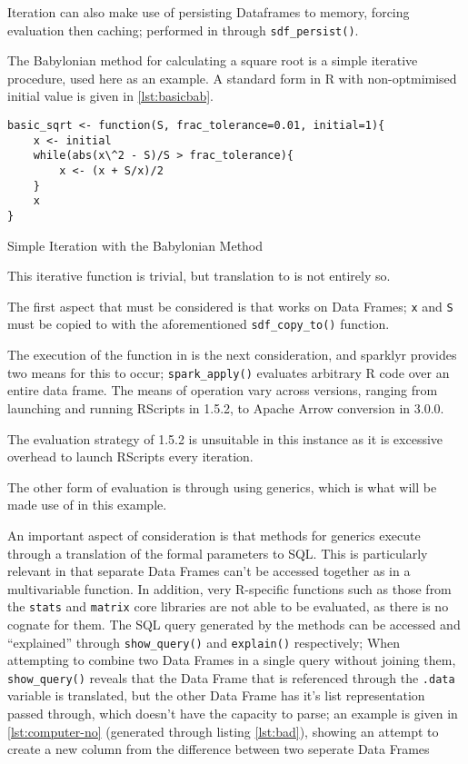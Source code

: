 Iteration can also make use of persisting  Dataframes to memory,
forcing evaluation then caching; performed in  through
\texttt{sdf_persist()}.

The Babylonian method for calculating a square root is a simple
iterative procedure, used here as an example. A standard form in R with
non-optmimised initial value is given in \cref{lst:basicbab}.

\begin{listing}
	\begin{verbatim}
basic_sqrt <- function(S, frac_tolerance=0.01, initial=1){
	x <- initial
	while(abs(x\^2 - S)/S > frac_tolerance){
		x <- (x + S/x)/2
	}
	x
}
\end{verbatim}
	\caption{Simple Iteration with the Babylonian Method}
	\label{lst:basicbab}
\end{listing}


This iterative function is trivial, but translation to  is not
entirely so.

The first aspect that must be considered is that  works on 
Data Frames; \texttt{x} and \texttt{S} must be copied to  with the
aforementioned \texttt{sdf_copy_to()}
function.

The execution of the function in  is the next consideration, and
sparklyr provides two means for this to occur;
\texttt{spark_apply()} evaluates arbitrary R
code over an entire data frame. The means of operation vary across 
versions, ranging from launching and running RScripts in  1.5.2, to
Apache Arrow conversion in  3.0.0.

The evaluation strategy of 1.5.2 is unsuitable in this instance as it is
excessive overhead to launch RScripts every iteration.

The other form of evaluation is through using  generics, which is
what will be made use of in this example.

An important aspect of consideration is that  methods for 
generics execute through a translation of the formal parameters to 
SQL. This is particularly relevant in that separate  Data Frames
can't be accessed together as in a multivariable function. In addition,
very R-specific functions such as those from the \texttt{stats} and
\texttt{matrix} core libraries are not able to be evaluated, as there is
no  cognate for them. The SQL query generated by the methods
can be accessed and ``explained'' through
\texttt{show_query()} and
\texttt{explain()} respectively; When attempting
to combine two  Data Frames in a single query without joining them,
\texttt{show_query()} reveals that the Data
Frame that is referenced through the \texttt{.data} variable is
translated, but the other Data Frame has it's list representation passed
through, which  doesn't have the capacity to parse; an example
is given in \cref{lst:computer-no} (generated through listing
\cref{lst:bad}), showing an attempt to create a new column from the
difference between two seperate Data Frames

